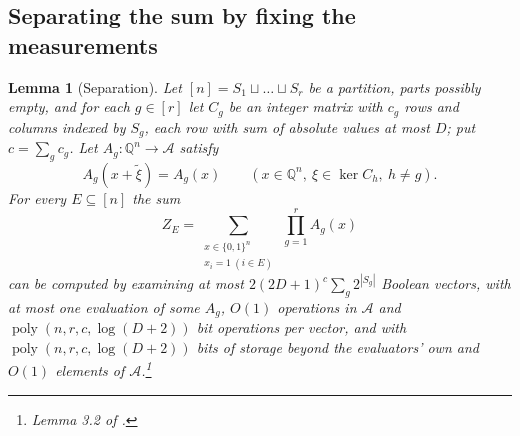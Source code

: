 \documentclass[11pt,reqno]{amsart}
\numberwithin{equation}{section}
\theoremstyle{plain}
\newtheorem{lemma}[theorem]{Lemma}
\theoremstyle{definition}
\theoremstyle{remark}
\DeclareMathOperator{\poly}{poly}
\newcommand{\A}{\mathcal{A}}
\newcommand{\Q}{\mathbb{Q}}
\begin{document}
\subsection{Separating the sum by fixing the measurements}
\begin{lemma}[Separation]\label{lem:separation}
Let $[n]=S_1\sqcup\dots\sqcup S_r$ be a partition, parts possibly empty, and
for each $g\in[r]$ let $C_g$ be an integer matrix with $c_g$ rows and columns
indexed by $S_g$, each row with sum of absolute values at most $D$; put
$c=\sum_g c_g$. Let $A_g:\Q^n\to\A$ satisfy
\begin{equation}\label{eq:invariance}
  A_g(x+\tilde\xi)=A_g(x)\qquad(x\in\Q^n,\ \xi\in\ker C_h,\ h\ne g).
\end{equation}
For every $E\subseteq[n]$ the sum
\[
  Z_E=\sum_{\substack{x\in\{0,1\}^n\\ x_i=1\ (i\in E)}}\ \prod_{g=1}^{r}A_g(x)
\]
can be computed by examining at most $2(2D+1)^{c}\sum_{g}2^{|S_g|}$ Boolean
vectors, with at most one evaluation of some $A_g$, $O(1)$ operations in $\A$ and
$\poly(n,r,c,\log(D+2))$ bit operations per vector, and with $\poly(n,r,c,\log(D+2))$
bits of storage beyond the evaluators' own and $O(1)$ elements of
$\A$.\footnote{Lemma 3.2 of \cite{OAI26}.}
\end{lemma}
\end{document}
